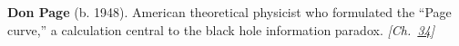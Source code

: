 \textbf{Don Page} (b. 1948). American theoretical physicist who formulated the ``Page curve,'' a calculation central to the black hole information paradox. \emph{[Ch.~\hyperref[ch:boltzmannbrain]{34}]}

